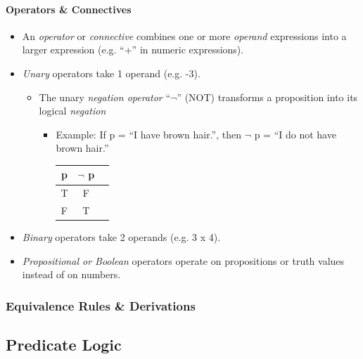 \documentclass[english, 11pt]{article}
\begin{document}
\begin{addmargin}[2em]{2em}
\begin{addmargin}[1em]{2em}
          \paragraph{Operators \& Connectives}
          \begin{itemize}
            \item An \textit{operator} or \textit{connective} combines one or
            more \textit{operand} expressions into a larger expression
            (e.g. ``+'' in numeric expressions).
            \item \textit{Unary} operators take 1 operand (e.g. -3).
              \begin{itemize}
                \item The unary \textit{negation operator} ``\( \neg \)''
                (NOT) transforms a proposition into its logical \textit{negation}
                \begin{itemize}
                  \item Example: If p = ``I have brown hair.'', then
                  \( \neg \) p = ``I do not have brown hair.''
                    \begin{tabular}{c|cc}
                      p & $\neg$ p \\
                      \hline
                      T & F \\
                      F & T
                    \end{tabular}
                \end{itemize}
              \end{itemize}
            \item \textit{Binary} operators take 2 operands (e.g. 3 x 4).
            \item \textit{Propositional or Boolean} operators operate on
            propositions or truth values instead of on numbers.
          \end{itemize}


    \end{addmargin}


  \subsubsection{Equivalence Rules \& Derivations}


\end{addmargin}
\subsection{Predicate Logic}
\end{document}
